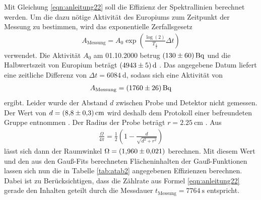 Mit Gleichung \eqref{eqn:anleitung22} soll die Effizienz der Spektrallinien berechnet werden.
Um die dazu nötige Aktivität des Europiums zum Zeitpunkt der Messung zu bestimmen, wird das exponentielle Zerfallsgesetz
\begin{align}
A_\text{Messung}=A_0\exp\left(\frac{\log(2)}{T_{\frac{1}{2}}}\Delta t\right)
\end{align}
verwendet.
Die Aktivität $A_0$ am 01.10.2000 betrug $\SI{130+-60}{\becquerel}$ und die Halbwertszeit von Europium beträgt $\SI{4943+-5}{\day}$ \cite{sample}.
Das angegebene Datum liefert eine zeitliche Differenz von $\Delta t=\SI{6084}{\day}$, sodass sich eine Aktivität von 
\begin{align*}
A_\text{Messung}=\SI{1760+-26}{\becquerel}
\end{align*}
ergibt.
Leider wurde der Abstand $d$ zwischen Probe und Detektor nicht gemessen. 
Der Wert von $d=\SI{8.8+-0.3}{\centi\meter}$ wird deshalb dem Protokoll einer befreundeten Gruppe entnommen \cite{abstand}.
Der Radius der Probe beträgt $r=\SI{2.25}{\centi\meter}$ \cite{sample}.
Aus
\begin{align}
\frac{\Omega}{4\pi}=\frac{1}{2}\left( 1- \frac{d}{\sqrt{d^2+r^2}}\right)
\end{align}
lässt sich dann der Raumwinkel $\Omega=\SI{1.96+-0.021}{}$ berechnen.
Mit diesem Wert und den aus den Gauß-Fits berechneten Flächeninhalten der Gauß-Funktionen lassen sich nun die in Tabelle \ref{tab:atab2} angegebenen Effizienzen berechnen.
Dabei ist zu Berücksichtigen, dass die Zählrate aus Formel \ref{eqn:anleitung22} gerade den Inhalten geteilt durch die Messdauer $t_\text{Messung}=\SI{7764}{\second}$ entspricht.
